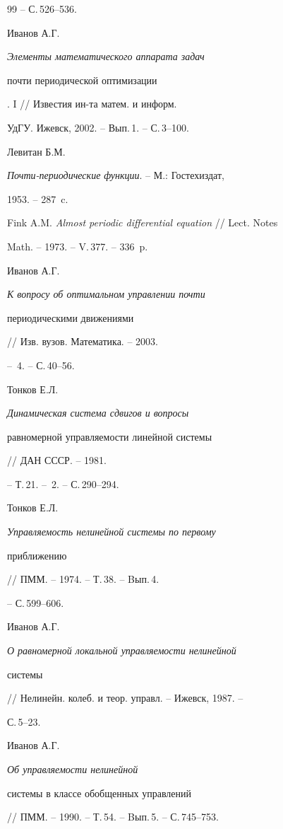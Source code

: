\begin{thebibliography}{99}
-- С.\,526--536.




Иванов А.Г. {\em Элементы математического аппарата задач


почти периодической оптимизации}. I // Известия ин-та матем. и информ.


УдГУ. Ижевск, 2002. -- Вып.\,1. -- С.\,3--100.




Левитан Б.М.


{\em Почти-периодические функции}. -- М.: Гостехиздат,


1953. -- 287~c.




Fink A.M. {\em Almost periodic differential equation} // Lect. Notes


Math. -- 1973. -- V.\,377. -- 336~p.




Иванов А.Г. {\em К вопросу об оптимальном управлении почти


периодическими движениями} // Изв. вузов. Математика. -- 2003.


-- \No\,4. -- С.\,40--56.




Тонков Е.Л. {\em Динамическая система сдвигов и вопросы


равномерной управляемости линейной системы} // ДАН СССР. -- 1981.


-- Т.\,21. -- \No\,2. -- С.\,290--294.




Тонков Е.Л. {\em Управляемость нелинейной системы по первому


приближению} // ПММ. -- 1974. -- Т.\,38. -- Bып.\,4.


-- С.\,599--606.




Иванов А.Г. {\em О равномерной локальной управляемости нелинейной


системы} // Нелинейн. колеб. и теор. управл. -- Ижевск, 1987. --


С.\,5--23.




Иванов А.Г. {\em Об управляемости нелинейной


системы в классе обобщенных управлений}


// ПММ. -- 1990. -- Т.\,54. -- Bып.\,5. -- С.\,745--753.





\end{thebibliography}
